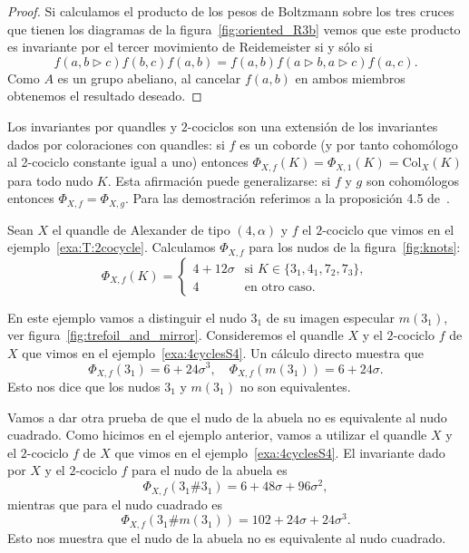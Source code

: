 \documentclass[graybox]{svmult}
\begin{document}
\begin{theorem}
\begin{proof}
	    Si calculamos el producto de los pesos de
        Boltzmann sobre los tres cruces que tienen los diagramas de la
        figura~\ref{fig:oriented_R3b} vemos que este producto es invariante por
        el tercer movimiento de Reidemeister si y sólo si
        \[
        f(a,b\triangleright c)f(b,c)f(a,b)=f(a,b)f(a\triangleright b,a\triangleright c)f(a,c).
        \]
        Como $A$ es un grupo abeliano, al cancelar $f(a,b)$ en ambos miembros 
        obtenemos el resultado deseado.
    \end{proof}
\end{theorem}

\label{block:cocycles_and_colorings}
Los invariantes por quandles y $2$-cociclos son una extensión de los invariantes dados por
coloraciones con quandles: si $f$ es un coborde (y por tanto cohomólogo al 2-cociclo constante igual a uno) 
entonces
$\Phi_{X,f}(K)=\Phi_{X,1}(K)=\mathrm{Col}_X(K)$ para todo nudo $K$.	Esta afirmación puede
generalizarse: si $f$ y $g$ son cohomólogos entonces $\Phi_{X,f}=\Phi_{X,g}$.
Para las demostración referimos a la proposición 4.5 de~\cite{MR1990571}.

\begin{example}
	\label{exa:2cocycle:prime_knots}
    Sean $X$ el quandle de Alexander de tipo $(4,\alpha)$ y $f$ el $2$-cociclo
    que vimos en el ejemplo~\ref{exa:T:2cocycle}.  Calculamos  
    $\Phi_{X,f}$ para los nudos de la figura~\ref{fig:knots}:
    \[
    \Phi_{X,f}(K)=\begin{cases}
        4+12\sigma & \text{si $K\in\{3_1,4_1,7_2,7_3\}$},\\
        4 & \text{en otro caso}.
    \end{cases}
    \]
\end{example}

\begin{example}
	\label{exa:2cocycle:3_1andm(3_1)}
    En este ejemplo vamos a distinguir el nudo $3_1$ de su imagen especular
    $m(3_1)$, ver figura~\ref{fig:trefoil_and_mirror}.  Consideremos el quandle
    $X$ y el $2$-cociclo $f$ de $X$ que vimos en el
    ejemplo~\ref{exa:4cyclesS4}.  Un cálculo directo muestra que
    \[
    \Phi_{X,f}(3_1)=6+24\sigma^3,\quad
    \Phi_{X,f}(m(3_1))=6+24\sigma.
    \]
    Esto nos dice que los nudos $3_1$ y $m(3_1)$ no son equivalentes. 
\end{example}

\begin{example}
	\label{exa:granny_vs_square:3}
	Vamos a dar otra prueba de que el nudo de la abuela no es equivalente al nudo cuadrado. 
    Como hicimos en el ejemplo anterior, vamos a utilizar el quandle $X$ y 
    el $2$-cociclo $f$ de $X$ que vimos en el ejemplo~\ref{exa:4cyclesS4}.  El
    invariante dado por $X$ y el $2$-cociclo $f$ para el nudo de la abuela es
    \[
    \Phi_{X,f}(3_1\#3_1)=6+48\sigma+96\sigma^2,
    \]
    mientras que para el nudo cuadrado es 
    \[
    \Phi_{X,f}(3_1\#m(3_1))=102+24\sigma+24\sigma^3.
    \]
    Esto nos muestra que el nudo de la abuela no es equivalente al nudo
    cuadrado.
\end{example}




\end{document}
